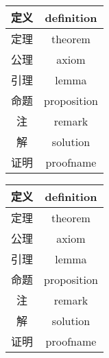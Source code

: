 \begin{tcode}
	{%
		\centering
		\vspace{10pt}				
		\begin{tabular}{|c|c|}
			\hline               
			定义      &   definition  \\   \hline 
			定理      &   theorem    \\   \hline
			公理      &   axiom		\\   \hline
			引理		&	lemma		\\   \hline
			命题	   &	proposition \\  \hline
			注		  &	  remark		\\  \hline
			解		  &	  solution   \\ \hline
			证明		&	proofname  \\ \hline
				\end{tabular}
	}
\end{tcode}

	{
	\centering
	\vspace{10pt}
	\begin{tabular}{|c|c|}
		\hline               
		定义      &   definition  \\   \hline 
		定理      &   theorem    \\   \hline
		公理      &   axiom		\\   \hline
		引理		&	lemma		\\   \hline
		命题	   &	proposition \\  \hline
		注		  &	  remark		\\  \hline
		解		  &	  solution   \\ \hline
		证明		&	proofname  \\ \hline
	\end{tabular}

}


